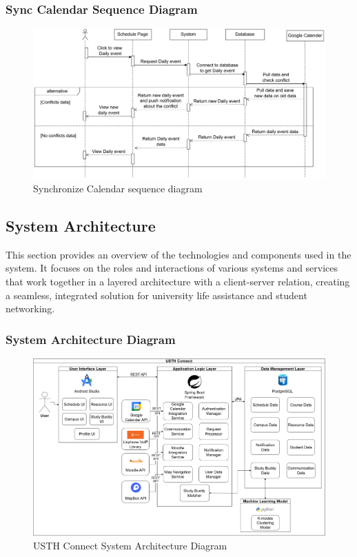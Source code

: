 \documentclass[12pt]{article}
\begin{document}
\subsubsection{Sync Calendar Sequence Diagram}

    \begin{figure}[H]
        \centering
        \includegraphics[width=1\textwidth]{image/SyncCalendar.pdf} 
        \caption{Synchronize Calendar sequence diagram}
        \label{fig:sync_calendar_sequence}
    \end{figure}




\subsection{System Architecture}
This section provides an overview of the technologies and components used in the system.
It focuses on the roles and interactions of various systems and services that work together in a layered architecture with a client-server relation, creating a seamless, integrated solution for university life assistance and student networking.

\subsubsection{System Architecture Diagram}
\begin{figure}[H]
    \centering
    \includegraphics[width=\textwidth]{image/USTH-Connect-System-Architecture-v2.pdf} 
    \caption{USTH Connect System Architecture Diagram}
\end{figure}
\end{document}
